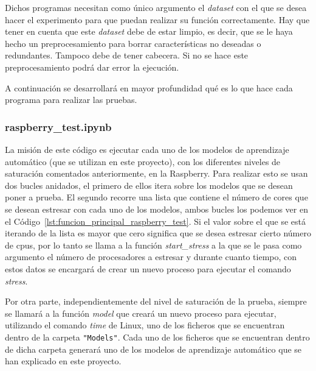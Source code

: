 \documentclass[a4paper, 12pt]{book}
\begin{document}
Dichos programas necesitan como único argumento el \textit{dataset} con el que se desea hacer el experimento para que puedan realizar su función correctamente.
Hay que tener en cuenta que este \textit{dataset} debe de estar limpio, es decir, que se le haya hecho un preprocesamiento para borrar características no deseadas o redundantes. Tampoco debe de tener cabecera. Si no se hace este preprocesamiento podrá dar error la ejecución.

A continuación se desarrollará en mayor profundidad qué es lo que hace cada programa para realizar las pruebas.


\subsubsection{raspberry\_test.ipynb}
\label{subsubsec:programa_pruebas_raspberry}

La misión de este código es ejecutar cada uno de los modelos de aprendizaje automático (que se utilizan en este proyecto), con los diferentes niveles de saturación comentados anteriormente, en la Raspberry. Para realizar esto se usan dos bucles anidados, el primero de ellos itera sobre los modelos que se desean poner a prueba. El segundo recorre una lista que contiene el número de cores que se desean estresar con cada uno de los modelos, ambos bucles los podemos ver en el Código~\ref{lst:funcion_principal_raspberry_test}. Si el valor sobre el que se está iterando de la lista es mayor que cero significa que se desea estresar cierto número de cpus, por lo tanto se llama a la función \textit{start\_stress} a la que se le pasa como argumento el número de procesadores a estresar y durante cuanto tiempo, con estos datos se encargará de crear un nuevo proceso para ejecutar el comando \textit{stress}.

Por otra parte, independientemente del nivel de saturación de la prueba, siempre se llamará a la función \textit{model} que creará un nuevo proceso para ejecutar, utilizando el comando \textit{time} de Linux, uno de los ficheros que se encuentran dentro de la carpeta \texttt{"Models"}. Cada uno de los ficheros que se encuentran dentro de dicha carpeta generará uno de los modelos de aprendizaje automático que se han explicado en este proyecto. 
\end{document}
